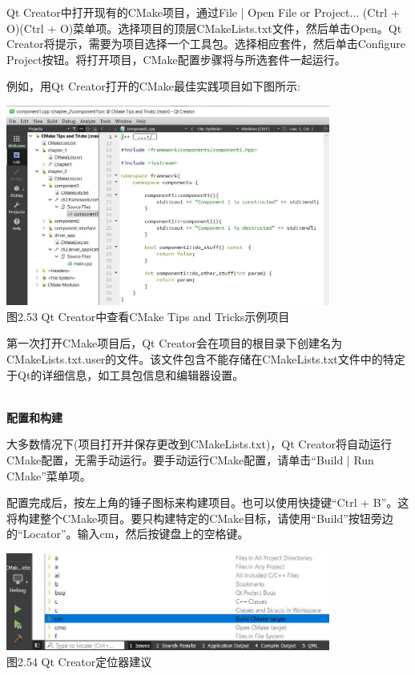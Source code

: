 Qt Creator中打开现有的CMake项目，通过File | Open File or Project... (Ctrl + O)(Ctrl + O)菜单项。选择项目的顶层CMakeLists.txt文件，然后单击Open。Qt Creator将提示，需要为项目选择一个工具包。选择相应套件，然后单击Configure Project按钮。将打开项目，CMake配置步骤将与所选套件一起运行。

例如，用Qt Creator打开的CMake最佳实践项目如下图所示:

\begin{center}
\includegraphics[width=0.8\textwidth]{content/1/chapter2/images/53.jpg}\\
图2.53 Qt Creator中查看CMake Tips and Tricks示例项目
\end{center}

第一次打开CMake项目后，Qt Creator会在项目的根目录下创建名为CMakeLists.txt.user的文件。该文件包含不能存储在CMakeLists.txt文件中的特定于Qt的详细信息，如工具包信息和编辑器设置。

\hspace*{\fill} \\ %
\noindent
\textbf{配置和构建}

大多数情况下(项目打开并保存更改到CMakeLists.txt)，Qt Creator将自动运行CMake配置，无需手动运行。要手动运行CMake配置，请单击“Build | Run CMake”菜单项。

配置完成后，按左上角的锤子图标来构建项目。也可以使用快捷键“Ctrl + B”。这将构建整个CMake项目。要只构建特定的CMake目标，请使用“Build”按钮旁边的“Locator”。输入cm，然后按键盘上的空格键。

\begin{center}
\includegraphics[width=0.8\textwidth]{content/1/chapter2/images/54.jpg}\\
图2.54 Qt Creator定位器建议
\end{center}

